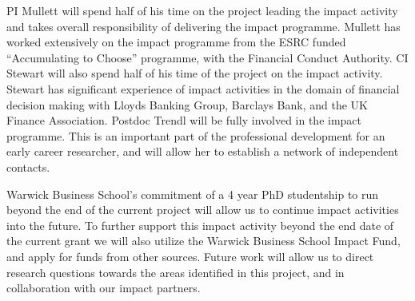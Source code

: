 \documentclass[11pt, a4paper]{article}
\newcommand{\TM}[1] {{\textcolor{orange}{#1}}}
\begin{document}







PI Mullett will spend half of his time on the project leading the impact activity and takes overall responsibility of delivering the impact programme. Mullett has worked extensively on the impact programme from the ESRC funded ``Accumulating to Choose'' programme, with the Financial Conduct Authority. CI Stewart will also spend half of his time of the project on the impact activity. Stewart has significant experience of impact activities in the domain of financial decision making with Lloyds Banking Group, Barclays Bank, and the UK Finance Association. Postdoc Trendl will be fully involved in the impact programme. This is an important part of the professional development for an early career researcher, and will allow her to establish a network of independent contacts. 

Warwick Business School's commitment of a 4 year PhD studentship to run beyond the end of the current project will allow us to continue impact activities into the future. To further support this impact activity beyond the end date of the current grant we will also utilize the Warwick Business School Impact Fund, and apply for funds from other sources. Future work will allow us to direct research questions towards the areas identified in this project, and in collaboration with our impact partners. 
\end{document}
